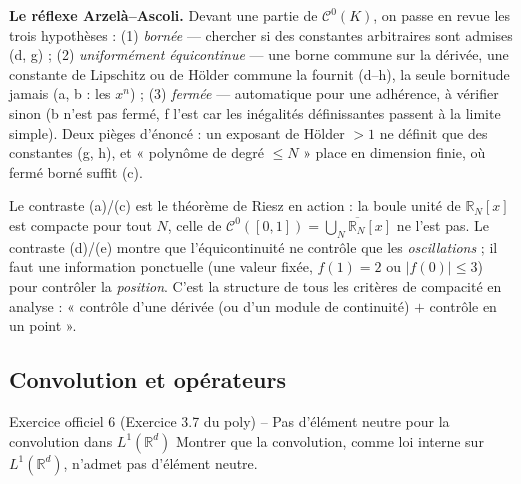 \documentclass[11pt,a4paper]{article}
\newcommand{\R}{\mathbb{R}}
\newcommand{\adh}[1]{\overline{#1}}
\newcommand{\Cz}{\mathcal{C}^0}
\theoremstyle{definition}
\begin{document}
\begin{pointcle}
\textbf{Le réflexe Arzelà--Ascoli.} Devant une partie de $\Cz(K)$, on passe en revue les trois hypothèses : (1) \emph{bornée} — chercher si des constantes arbitraires sont admises (d, g) ; (2) \emph{uniformément équicontinue} — une borne commune sur la dérivée, une constante de Lipschitz ou de Hölder commune la fournit (d--h), la seule bornitude jamais (a, b : les $x^n$) ; (3) \emph{fermée} — automatique pour une adhérence, à vérifier sinon (b n'est pas fermé, f l'est car les inégalités définissantes passent à la limite simple). Deux pièges d'énoncé : un exposant de Hölder $>1$ ne définit que des constantes (g, h), et « polynôme de degré $\le N$ » place en dimension finie, où fermé borné suffit (c).
\end{pointcle}

\begin{commentaire}
Le contraste (a)/(c) est le théorème de Riesz en action : la boule unité de $\R_N[x]$ est compacte pour tout $N$, celle de $\Cz([0,1])=\adh{\bigcup_N\R_N[x]}$ ne l'est pas. Le contraste (d)/(e) montre que l'équicontinuité ne contrôle que les \emph{oscillations} ; il faut une information ponctuelle (une valeur fixée, $f(1)=2$ ou $|f(0)|\le3$) pour contrôler la \emph{position}. C'est la structure de tous les critères de compacité en analyse : « contrôle d'une dérivée (ou d'un module de continuité) $+$ contrôle en un point ».
\end{commentaire}

\subsection*{Convolution et opérateurs}

\begin{exo}{Exercice officiel 6 (Exercice 3.7 du poly) -- Pas d'élément neutre pour la convolution dans $L^1(\R^d)$}
Montrer que la convolution, comme loi interne sur $L^1(\R^d)$, n'admet pas d'élément neutre.
\end{exo}
\end{document}
